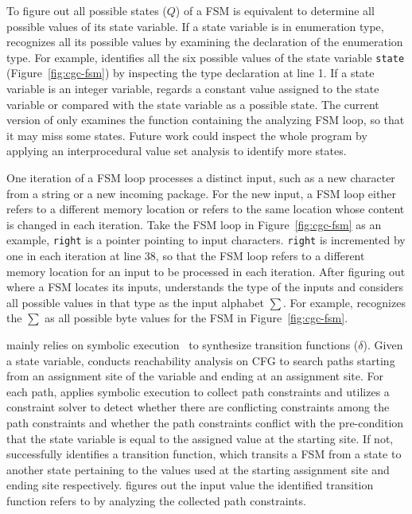 To figure out all possible states ($Q$) of a FSM 
is equivalent to determine all possible values of its state variable. 
If a state variable is in enumeration type, 
\Tool{} recognizes all its possible values 
by examining the declaration of the enumeration type. 
For example, \Tool{} identifies all the six possible values of 
the state variable \texttt{state} (Figure~\ref{fig:cgc-fsm}) 
by inspecting the type declaration at line 1. 
If a state variable is an integer variable, \Tool{} regards 
a constant value assigned to the state variable or 
compared with the state variable as a possible state. 
The current version of \Tool{} only examines the function
containing the analyzing FSM loop, so that it may miss some states. 
Future work could inspect the whole program by 
applying an interprocedural 
value set analysis to identify more states. 


One iteration of a FSM loop processes a distinct input, 
such as a new character from a string or a new incoming package. 
For the new input, a FSM loop either refers to a different memory location 
or refers to the same location whose content is changed in each iteration.  
Take the FSM loop in Figure~\ref{fig:cgc-fsm} as an example, 
\texttt{right} is a pointer pointing to input characters.
\texttt{right} is incremented by one in each iteration at line 38, 
so that the FSM loop refers to a different memory location 
for an input to be processed in each iteration.  
After figuring out where a FSM locates its inputs, 
\Tool{} understands the type of the inputs 
and considers all possible values in that type
as the input alphabet $\sum$. For example, \Tool{} recognizes 
the $\sum$ as all possible byte values 
for the FSM in Figure~\ref{fig:cgc-fsm}. 


\Tool{} mainly relies on symbolic execution~\cite{klee,s2e} 
to synthesize transition functions ($\delta$).  
Given a state variable,
\Tool{} conducts reachability analysis on CFG to search paths starting 
from an assignment site of the variable 
and ending at an assignment site. 
For each path, \Tool{} applies symbolic execution to 
collect path constraints and utilizes a constraint solver to 
detect whether there are conflicting constraints among the path constraints 
and whether the path constraints conflict with the pre-condition 
that the state variable is equal 
to the assigned value at the starting site. 
If not, \Tool{} successfully identifies a transition function, 
which transits a FSM from a state to another state pertaining to 
the values used at the starting assignment 
site and ending site respectively. 
\Tool{} figures out the input value the identified 
transition function refers to 
by analyzing the collected path constraints. 


